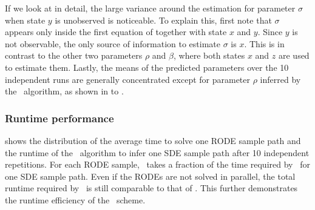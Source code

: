 If we look at  in detail, the large variance around the estimation for parameter $\sigma$ when state $y$ is unobserved is noticeable.
To explain this, first note that $\sigma$ appears only inside the first equation of  together with state $x$ and $y$.
Since $y$ is not observable, the only source of information to estimate $\sigma$ is  $x$.
This is in contrast to the other two parameters $\rho$ and $\beta$, where both states $x$ and $z$ are used to estimate them.
Lastly, the means of the predicted parameters over the 10 independent runs are generally concentrated except for parameter $\rho$ inferred by the \algovgpamap\ algorithm, as shown in  to .

\subsubsection*{Runtime performance}

 shows the distribution of the average time to solve one RODE sample path and the runtime of the \algovgpamap\ algorithm to infer one SDE sample path after 10 independent repetitions. 
For each RODE sample, \algolpmfsde\ takes a fraction of the time required by \algovgpamap\ for one SDE sample path.
Even if the RODEs are not solved in parallel, the total runtime required by \algolpmfsde\ is still comparable to that of \algovgpamap. 
This further demonstrates the runtime efficiency of the \algolpmfsde\ scheme.

